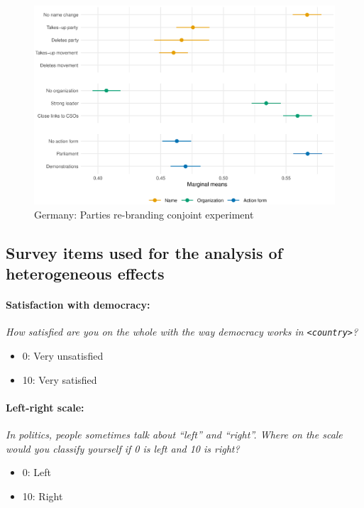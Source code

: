 \documentclass[12pt]{article}
\begin{document}
\begin{figure}[H]
\includegraphics[width=\textwidth]{./Figures/CJ2_main_tradeoff_Germany.eps}
\caption{Germany: Parties re-branding conjoint experiment}
\end{figure}

\newpage

\subsection{Survey items used for the analysis of heterogeneous effects}

\paragraph{Satisfaction with democracy:}
\textit{How satisfied are you on the whole with the way democracy works in \texttt{<country>}?} 
\begin{itemize}
  \item{0: Very unsatisfied} 
  \item{10: Very satisfied}
\end{itemize}

\paragraph{Left-right scale:}
\textit{In politics, people sometimes talk about ``left'' and ``right''. Where on the scale would you classify yourself if 0 is left and 10 is right?} 
\begin{itemize}
  \item{0: Left}
  \item{10: Right}
\end{itemize}
\end{document}
